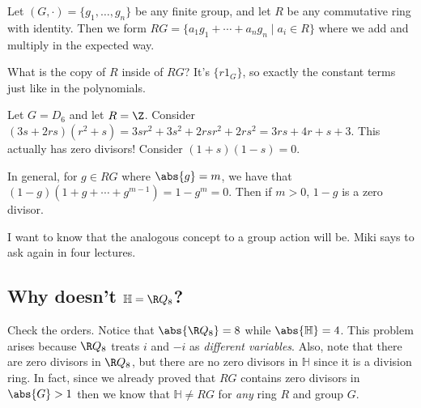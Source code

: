 Let $(G, \cdot) = \{g_1, \dotsc, g_n\}$ be any finite group, and let $R$ be any commutative ring with identity. Then we form $RG = \{a_1g_1 + \cdots + a_ng_n \mid a_i \in R\}$ where we add and multiply in the expected way.

\begin{problem}
What is the copy of $R$ inside of $RG$? It's $\{r1_G\}$, so exactly the constant terms just like in the polynomials.
\end{problem}

\begin{example}
Let $G = D_6$ and let $R = \Z$. Consider $(3s + 2rs)(r^2 + s) = 3sr^2 + 3s^2 + 2rsr^2 +2rs^2 = 3rs + 4r + s + 3$. This actually has zero divisors! Consider $(1+s)(1-s) = 0$.
\end{example}

In general, for $g \in RG$ where $\abs{g} = m$, we have that $(1-g)(1 + g + \cdots + g^{m-1}) = 1 - g^{m} = 0$. Then if $m > 0$, $1-g$ is a zero divisor.

I want to know that the analogous concept to a group action will be. Miki says to ask again in four lectures.

\subsection{Why doesn't \texorpdfstring{$\mathbb{H} = \R Q_8$}{H = RQ8}?}

Check the orders. Notice that $\abs{\R Q_8} = 8$ while $\abs{\mathbb{H}} = 4$. This problem arises because $\R Q_8$ treats $i$ and $-i$ as \emph{different variables}. Also, note that there are zero divisors in $\R Q_8$, but there are no zero divisors in $\mathbb{H}$ since it is a division ring. In fact, since we already proved that $RG$ contains zero divisors in $\abs{G} > 1$ then we know that $\mathbb{H} \not= RG$ for \emph{any} ring $R$ and group $G$.